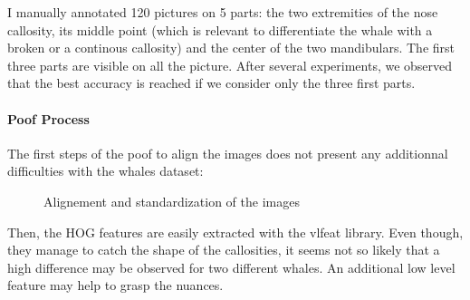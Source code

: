 \documentclass[twoside]{article}
\begin{document}
\begin{multicols}{2}
I manually annotated 120 pictures on 5 parts: the two extremities of the nose callosity, its middle point (which is relevant to differentiate the whale with a broken or a continous callosity) and the center of the two mandibulars. The first three parts are visible on all the picture. After several experiments, we observed that the best accuracy is reached if we consider only the three first parts.

\paragraph{Poof Process}

The first steps of the poof to align the images does not present any additionnal difficulties with the whales dataset:

\begin{figure}[H]
\centering
{}
\quad
{}
\caption{Alignement and standardization of the images}
\label{fig:fig_std}
\end{figure}

Then, the HOG features are easily extracted with the vlfeat library. Even though, they manage to catch the shape of the callosities, it seems not so likely that a high difference may be observed for two different whales. An additional low level feature may help to grasp the nuances.


\end{multicols}
\end{document}
